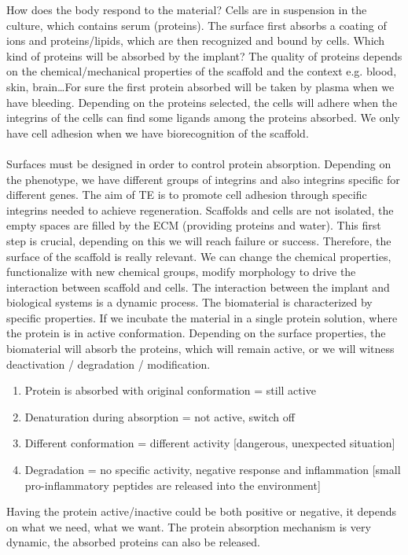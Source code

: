 \noindent
How does the body respond to the material?
Cells are in suspension in the culture, which contains serum (proteins). The surface first absorbs a coating of ions and proteins/lipids, which are then recognized and bound by cells.
Which kind of proteins will be absorbed by the implant? The quality of proteins depends on the chemical/mechanical properties of the scaffold and the context e.g. blood, skin, brain…For sure the first protein absorbed will be taken by plasma when we have bleeding. Depending on the proteins selected, the cells will adhere when the integrins of the cells can find some ligands among the proteins absorbed. 
We only have cell adhesion when we have biorecognition of the scaffold.
\\
\\
\noindent
Surfaces must be designed in order to control protein absorption. Depending on the phenotype, we have different groups of integrins and also integrins specific for different genes.
The aim of TE is to promote cell adhesion through specific integrins needed to achieve regeneration. Scaffolds and cells are not isolated,  the empty spaces are filled by the ECM (providing proteins and water). This first step is crucial, depending on this we will reach failure or success. Therefore, the surface of the scaffold is really relevant. We can change the chemical properties, functionalize with new chemical groups, modify morphology to drive the interaction between scaffold and cells.
The interaction between the implant and biological systems is a dynamic process. The biomaterial is characterized by specific properties. If we incubate the material in a single protein solution, where the protein is in active conformation. Depending on the surface properties, the biomaterial will absorb the proteins, which will remain active, or we will witness deactivation / degradation / modification. 
\begin{enumerate}
\item Protein is absorbed with original conformation = still active
\item Denaturation during absorption = not active, switch off
\item Different conformation = different activity [dangerous, unexpected situation]
\item Degradation = no specific activity, negative response and inflammation [small pro-inflammatory peptides are released into the environment]
\end{enumerate}
Having the protein active/inactive could be both positive or negative, it depends on what we need, what we want. The protein absorption mechanism is very dynamic, the absorbed proteins can also be released.
